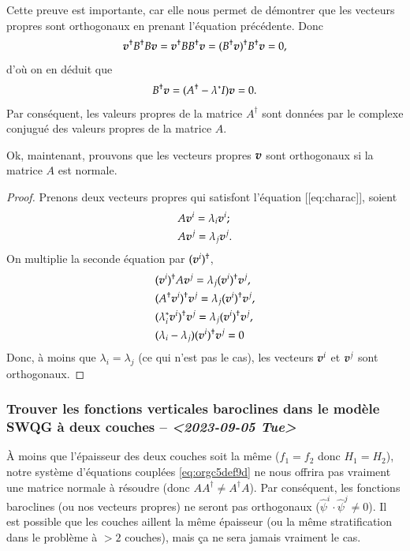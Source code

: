 \documentclass[10pt]{article}
\numberwithin{equation}{section}
\newcommand{\vv}{\vb*{v}}
\begin{document}
Cette preuve est importante, car elle nous permet de démontrer que les vecteurs propres sont orthogonaux en prenant l'équation précédente.
Donc
\begin{equation}
   \vv^\dagger B^\dagger B \vv = \vv^\dagger BB^\dagger \vv = (B^\dagger \vv)^\dagger B^\dagger \vv = 0,
\end{equation}
d'où on en déduit que
\begin{equation}
   B^\dagger \vv = (A^\dagger -\lambda^* I ) \vv = 0.
\end{equation}
Par conséquent, les valeurs propres de la matrice \(A^\dagger\) sont données par le complexe conjugué des valeurs propres de la matrice \(A\). \bigskip

Ok, maintenant, prouvons que les vecteurs propres \(\vv\) sont orthogonaux si la matrice \(A\) est normale.
\begin{proof}
Prenons deux vecteurs propres qui satisfont l'équation [[eq:charac]], soient
\begin{subequations}
\begin{align}
   &A \vv^i = \lambda_i\vv^i;\\
   &A \vv^j = \lambda_j\vv^j.
\end{align}
\end{subequations}
On multiplie la seconde équation par $(\vv^i)^\dagger$,
\begin{align}
   & (\vv^i)^\dagger A\vv^j = \lambda_j(\vv^i)^\dagger\vv^j,\nonumber\\
   & (A^\dagger\vv^i)^\dagger\vv^j = \lambda_j(\vv^i)^\dagger\vv^j,\nonumber\\
   & (\lambda_i^*\vv^i)^\dagger\vv^j = \lambda_j(\vv^i)^\dagger\vv^j,\nonumber\\
   & (\lambda_i - \lambda_j) (\vv^i)^\dagger\vv^j = 0
\end{align}
Donc, à moins que $\lambda_i = \lambda_j$ (ce qui n'est pas le cas), les vecteurs $\vv^i$ et $\vv^j$ sont orthogonaux. \end{proof}

\subsubsection{Trouver les fonctions verticales baroclines dans le modèle SWQG à deux couches -- \textit{<2023-09-05 Tue>}}
\label{sec:orgc4b2a58}

À moins que l'épaisseur des deux couches soit la même (\(f_1 = f_2\) donc \(H_1 = H_2\)), notre système d'équations couplées \ref{eq:orgc5def9d} ne nous offrira pas vraiment une matrice normale à résoudre (donc \(AA^\dagger\not=A^\dagger A\)).
Par conséquent, les fonctions baroclines (ou nos vecteurs propres) ne seront pas orthogonaux (\(\hat{\psi}^i \cdot \hat{\psi}^j \not= 0\)).
Il est possible que les couches aillent la même épaisseur (ou la même stratification dans le problème à \(>2\) couches), mais ça ne sera jamais vraiment le cas.\bigskip
\end{document}
